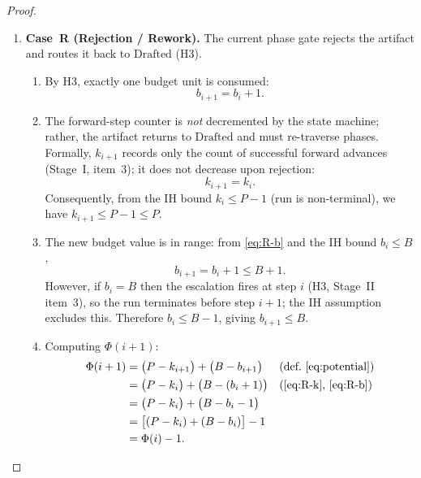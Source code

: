 \documentclass[12pt]{article}
\theoremstyle{definition}
\begin{document}
\begin{proof}
\begin{enumerate}
  \item \textbf{Case~R (Rejection / Rework).}
        The current phase gate rejects the artifact and routes it back
        to $\mathrm{Drafted}$ (H3).
        \begin{enumerate}
          \item By H3, exactly one budget unit is consumed:
                \begin{equation}
                  \label{eq:R-b}
                  b_{i+1} = b_i + 1.
                \end{equation}
          \item The forward-step counter is \emph{not} decremented by
                the state machine; rather, the artifact returns to
                $\mathrm{Drafted}$ and must re-traverse phases.
                Formally, $k_{i+1}$ records only the count of
                successful forward advances (Stage~I, item~3); it does
                not decrease upon rejection:
                \begin{equation}
                  \label{eq:R-k}
                  k_{i+1} = k_i.
                \end{equation}
                Consequently, from the IH bound $k_i \leq P-1$ (run
                is non-terminal), we have $k_{i+1} \leq P - 1 \leq P$.
          \item The new budget value is in range: from \eqref{eq:R-b}
                and the IH bound $b_i \leq B$,
                \begin{equation}
                  \label{eq:R-b-bound}
                  b_{i+1} = b_i + 1 \leq B + 1.
                \end{equation}
                However, if $b_i = B$ then the escalation fires at
                step $i$ (H3, Stage~II item~3), so the run terminates
                before step $i+1$; the IH assumption excludes this.
                Therefore $b_i \leq B - 1$, giving $b_{i+1} \leq B$.
          \item Computing $\Phi(i+1)$:
                \begin{align}
                  \Phi(i+1)
                    &= \bigl(P - k_{i+1}\bigr) + \bigl(B - b_{i+1}\bigr)
                       && \text{(def.\ \eqref{eq:potential})} \notag\\
                    &= \bigl(P - k_i\bigr) + \bigl(B - (b_i+1)\bigr)
                       && \text{(\eqref{eq:R-k}, \eqref{eq:R-b})} \notag\\
                    &= \bigl(P - k_i\bigr) + \bigl(B - b_i - 1\bigr)
                       \notag\\
                    &= \bigl[(P - k_i) + (B - b_i)\bigr] - 1
                       \notag\\
                    &= \Phi(i) - 1.
                       \label{eq:R-result}
                \end{align}
        \end{enumerate}
\end{enumerate}


\end{proof}
\end{document}
